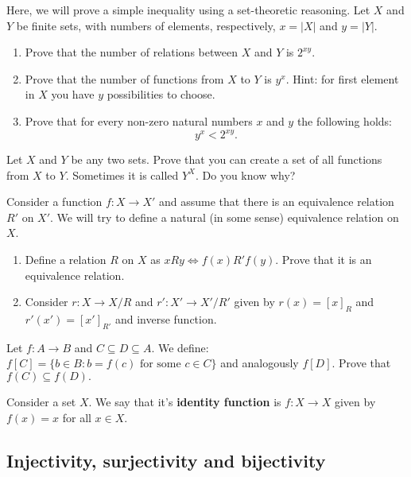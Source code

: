 \begin{exercise}
  Here, we will prove a simple inequality using a set-theoretic reasoning. Let $X$ and $Y$ be finite sets, with numbers of elements, respectively, $x=|X|$ and $y=|Y|$.
  \begin{enumerate}
    \item Prove that the number of relations between $X$ and $Y$ is $2^{xy}$.
    \item Prove that the number of functions from $X$ to $Y$ is $y^x$. Hint: for first element in $X$ you have $y$ possibilities to choose.
    \item Prove that for every non-zero natural numbers $x$ and $y$ the following holds:
      $$y^x<2^{xy}.$$
  \end{enumerate}
\end{exercise}

\begin{exercise}
  Let $X$ and $Y$ be any two sets. Prove that you can create a set of all functions from $X$ to $Y$. Sometimes it is called $Y^X$. Do you know why?
\end{exercise}

\begin{exercise}
  Consider a function $f: X\to X'$ and assume that there is an equivalence relation $R'$ on $X'$. We will try to define a natural (in some sense) equivalence relation on $X$.
  \begin{enumerate}
    \item Define a relation $R$ on $X$ as $xRy\Leftrightarrow f(x) R' f(y)$. Prove that it is an equivalence relation.
    \item Consider $r: X\to X/R$ and $r': X'\to X'/R'$ given by $r(x)=[x]_R$ and $r'(x')=[x']_{R'}$ and inverse function.
  \end{enumerate}
\end{exercise}

\begin{prob}
	Let $f: A\to B$ and $C\subseteq D\subseteq A$. We define: $f[C] = \{b\in B : b=f(c) \text{ for some }c\in C \}$ and analogously $f[D]$. Prove that
	$f(C)\subseteq f(D).$
\end{prob}

\begin{definition}
  Consider a set $X$. We say that it's \textbf{identity function} is $f:X\to X$ given by $f(x)=x$ for all $x\in X$.
\end{definition}

\subsection{Injectivity, surjectivity and bijectivity}

